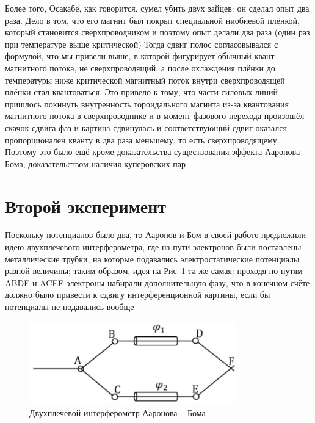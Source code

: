 \documentclass[a4paper, 14pt]{article}
\begin{document}
    Более того, Осакабе, как говорится, сумел убить двух зайцев: он сделал опыт два раза.
    Дело в том, что его магнит был покрыт специальной ниобиевой плёнкой, который становится сверхпроводником и поэтому
    опыт делали два раза (один раз при температуре выше критической)
    Тогда сдвиг полос согласовывался с формулой, что мы привели выше, в которой фигурирует обычный квант магнитного
    потока, не сверхпроводящий, а после охлаждения плёнки до температуры ниже критической магнитный поток внутри
    сверхпроводящей плёнки стал квантоваться.
    Это привело к тому, что части силовых линий пришлось покинуть внутренность тороидального магнита из-за
    квантования магнитного потока в сверхпроводнике и в момент фазового перехода произошёл скачок сдвига фаз и картина
    сдвинулась и соответствующий сдвиг оказался пропорционален кванту в два раза меньшему, то есть сверхпроводящему.
    Поэтому это было ещё кроме доказательства существования эффекта Ааронова -- Бома, доказательством наличия
    куперовских пар
    
    \section*{Второй эксперимент} 
    
    Поскольку потенциалов было два, то Ааронов и Бом в своей работе предложили идею двухплечевого интерферометра,
    где на пути электронов были поставлены металлические трубки, на которые подавались электростатические потенциалы
    разной величины; таким образом, идея на Рис~\ref{fig:exp4} та же самая: проходя по путям ABDF и ACEF электроны
    набирали дополнительную фазу, что в конечном счёте должно было привести к сдвигу интерференционной картины, если
    бы потенциалы не подавались вообще
    
    \begin{figure}[h]
        \centering
        \includegraphics[width=0.8\textwidth]{exp4}
        \caption{Двухплечевой интерферометр Ааронова -- Бома}
        \label{fig:exp4}
    \end{figure}
    
\end{document}
